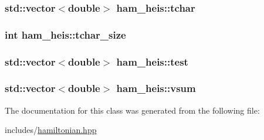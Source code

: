 \subsubsection[{\texorpdfstring{tchar}{tchar}}]{\setlength{\rightskip}{0pt plus 5cm}std\+::vector$<$double$>$ ham\+\_\+heis\+::tchar\hspace{0.3cm}{\ttfamily [protected]}}\hypertarget{classham__heis_a934a89b1b1ba1a0451eced2b7398139d}{}\label{classham__heis_a934a89b1b1ba1a0451eced2b7398139d}
\subsubsection[{\texorpdfstring{tchar\+\_\+size}{tchar_size}}]{\setlength{\rightskip}{0pt plus 5cm}int ham\+\_\+heis\+::tchar\+\_\+size\hspace{0.3cm}{\ttfamily [protected]}}\hypertarget{classham__heis_a35d572f45863870d8581a83821b890ae}{}\label{classham__heis_a35d572f45863870d8581a83821b890ae}
\subsubsection[{\texorpdfstring{test}{test}}]{\setlength{\rightskip}{0pt plus 5cm}std\+::vector$<$double$>$ ham\+\_\+heis\+::test\hspace{0.3cm}{\ttfamily [protected]}}\hypertarget{classham__heis_a5537fc1b0944509d2911fd35b4674c67}{}\label{classham__heis_a5537fc1b0944509d2911fd35b4674c67}
\subsubsection[{\texorpdfstring{vsum}{vsum}}]{\setlength{\rightskip}{0pt plus 5cm}std\+::vector$<$double$>$ ham\+\_\+heis\+::vsum\hspace{0.3cm}{\ttfamily [protected]}}\hypertarget{classham__heis_ad7034ab0ac64b9c44f9975551acfc8ab}{}\label{classham__heis_ad7034ab0ac64b9c44f9975551acfc8ab}


The documentation for this class was generated from the following file\+:\begin{DoxyCompactItemize}
\item 
includes/\hyperlink{hamiltonian_8hpp}{hamiltonian.\+hpp}\end{DoxyCompactItemize}
